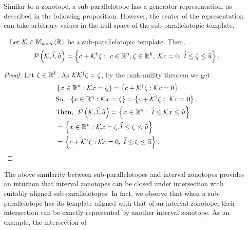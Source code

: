 Similar to a zonotope, a sub-parallelotope has a generator
representation, as described in the following proposition.  However,
the center of the representation can take arbitrary values in the null
space of the sub-parallelotopic template.
%
\begin{proposition}~\label{lem:ptope-iz-conversion}
  Let $\mathcal{K}\in\mathbb{M}_{k\times n}\left(\mathbb{R}\right)$ be a sub-parallelotopic template.
  Then,
  \[
  \mathcal{P}\left(\mathcal{K},\widehat{l},\widehat{u}\right)=\left\{c+{\mathcal{K}}^\dagger\zeta:~c\in\mathbb{R}^n,\zeta\in\mathbb{R}^k,~\mathcal{K}
  c=0,~\widehat{l}\leq
  \zeta\leq \widehat{u}
  \right\}.
  \]
%
\end{proposition}
%
\begin{proof}
Let $\zeta\in\mathbb{R}^k$.  As $\mathcal{K}{{\mathcal{K}}^\dagger\zeta}=\zeta$,
by the rank-nullity theorem we get
%
\begin{align*}
& \left\{x\in\mathbb{R}^n:\mathcal{K} x=\zeta\right\}=\left\{c+{\mathcal{K}}^\dagger\zeta:\mathcal{K} c=0\right\}.\\
& \text{So,}~~\left\{x\in\mathbb{R}^n:\mathcal{K} x=\zeta\right\}=\left\{c+{\mathcal{K}}^\dagger\zeta:~\mathcal{K} c=0\right\}.\\
& \text{Then,} ~~\mathcal{P}\left(\mathcal{K},\widehat{l},\widehat{u}\right) = \left\{x\in\mathbb{R}^n:~\widehat{l}\leq \mathcal{K} x\leq\widehat{u}\right\}\nonumber\\
& = \left\{x\in\mathbb{R}^n:\mathcal{K}
  x=\zeta, \widehat{l}\leq \zeta\leq\widehat{u}\right\}\nonumber\\
& = \left\{c+{\mathcal{K}}^\dagger\zeta:\mathcal{K} c=0,~\widehat{l}\leq\zeta\leq\widehat{u}\right\}.\hspace{5em}\qedhere
\end{align*}
%
\end{proof}
%
The above similarity between sub-parallelotopes and interval
zonotopes provides an intuition that interval zonotopes can be
closed under intersection with suitably aligned
sub-parallelotopes.  In fact, we observe that when a
sub-parallelotope has its template aligned with that of an interval
zonotope, their intersection can be exactly represented by another
interval zonotope.  As an example, the intersection of
%
